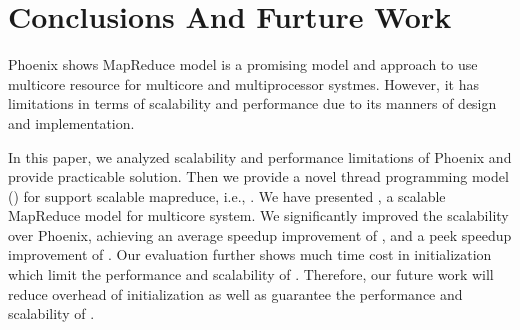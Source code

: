 \section{Conclusions And Furture Work}
\label{sec:concl}
Phoenix shows MapReduce model is a promising model and approach to use multicore resource for multicore and multiprocessor systmes.
However, it has limitations in terms of scalability and performance due to its manners of design and implementation.

In this paper, we analyzed scalability and performance limitations of Phoenix and provide practicable solution.
Then we provide a novel thread programming model (\myth) for support scalable mapreduce, i.e., \myds. 
We have presented \myds, a scalable MapReduce model for multicore system.
We significantly improved the scalability over Phoenix, achieving an average speedup improvement of , and a peek speedup improvement of .
Our evaluation further shows much time cost in initialization which limit the performance and scalability of \myds.
Therefore, our future work will reduce overhead of initialization as well as guarantee the performance and scalability of \myds.
